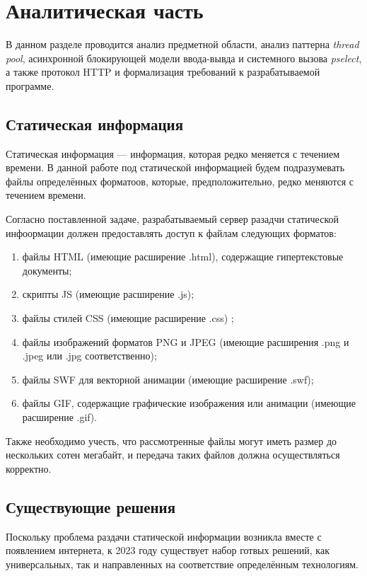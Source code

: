 \section{\large Аналитическая часть}

В данном разделе проводится анализ предметной области, анализ паттерна \textit{thread pool}, асинхронной блокирующей модели ввода-вывда и системного вызова \textit{pselect}, а также протокол HTTP и формализация требований к разрабатываемой программе.

\subsection{Статическая информация}

Статическая информация --- информация, которая редко меняется с течением времени. В данной работе под статической информацией будем подразумевать файлы определённых форматоов, которые, предположительно, редко меняются с течением времени. 

Согласно поставленной задаче, разрабатываемый сервер разадчи статической инфоормации должен предоставлять доступ к файлам следующих форматов:
\begin{enumerate}[label=\arabic*)]
	\item файлы HTML (имеющие расширение .html), содержащие гипертекстовые документы;
	\item скрипты JS (имеющие расширение .js);
	\item файлы стилей CSS (имеющие расширение .css) ;
	\item файлы изображений форматов PNG и JPEG (имеющие расширения .png и .jpeg или .jpg  соответственно);
	\item файлы SWF для векторной анимации (имеющие расширение .swf);
	\item файлы GIF, содержащие графические изображения или анимации (имеющие расширение .gif).
\end{enumerate}

Также необходимо учесть, что рассмотренные файлы могут иметь размер до нескольких сотен мегабайт, и передача таких файлов должна осуществляться корректно.

\subsection{Существующие решения}

Поскольку проблема раздачи статической информации возникла вместе с появлением интернета, к 2023 году существует набор готвых решений, как универсальных, так и направленных на соответствие определённым технологиям. 

